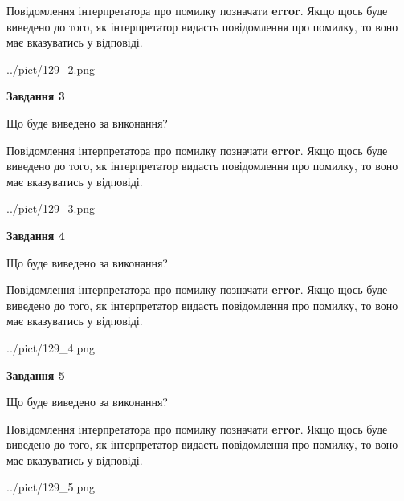\documentclass[12pt, ukrainian]{article}
\begin{document}
{\begin {large}
Повідомлення інтерпретатора про помилку позначати \textbf{error}.
Якщо щось буде виведено до того, як інтерпретатор видасть повідомлення про помилку, 
то воно має вказуватись у відповіді. \par


\begin{center}
	{../pict/129_2.png}
\end{center}
\newpage

{\begin {center}\textbf{Завдання 3}\end {center}}\par
Що буде виведено за виконання?

Повідомлення інтерпретатора про помилку позначати \textbf{error}.
Якщо щось буде виведено до того, як інтерпретатор видасть повідомлення про помилку, 
то воно має вказуватись у відповіді. \par


\begin{center}
	{../pict/129_3.png}
\end{center}
\newpage

{\begin {center}\textbf{Завдання 4}\end {center}}\par
Що буде виведено за виконання?

Повідомлення інтерпретатора про помилку позначати \textbf{error}.
Якщо щось буде виведено до того, як інтерпретатор видасть повідомлення про помилку, 
то воно має вказуватись у відповіді. \par


\begin{center}
	{../pict/129_4.png}
\end{center}
\newpage

{\begin {center}\textbf{Завдання 5}\end {center}}\par
Що буде виведено за виконання?

Повідомлення інтерпретатора про помилку позначати \textbf{error}.
Якщо щось буде виведено до того, як інтерпретатор видасть повідомлення про помилку, 
то воно має вказуватись у відповіді. \par


\begin{center}
	{../pict/129_5.png}
\end{center}
\newpage


\end{large}}
\end{document}
